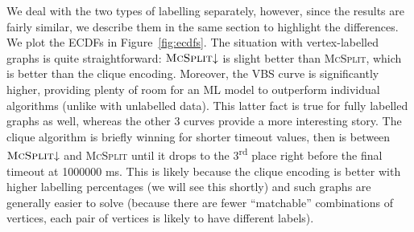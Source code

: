 \documentclass{l4proj}
\theoremstyle{definition}
\theoremstyle{remark}
\begin{document}
We deal with the two types of labelling separately, however, since the results
are fairly similar, we describe them in the same section to highlight the
differences. We plot the ECDFs in Figure~\ref{fig:ecdfs}. The situation with
vertex-labelled graphs is quite straightforward: $\textsc{McSplit}{\downarrow}$ is
slight better than \textsc{McSplit}, which is better than the clique encoding.
Moreover, the VBS curve is significantly higher, providing plenty of room for an
ML model to outperform individual algorithms (unlike with unlabelled data). This
latter fact is true for fully labelled graphs as well, whereas
the other 3 curves provide a more interesting story. The clique algorithm is
briefly winning for shorter timeout values, then is between
$\textsc{McSplit}{\downarrow}$ and \textsc{McSplit} until it drops to the
3\textsuperscript{rd} place right before the final timeout at \num{1000000} ms.
This is likely because the clique encoding is better with higher labelling
percentages (we will see this shortly) and such graphs are generally easier to
solve (because there are fewer ``matchable'' combinations of vertices, each pair
of vertices is likely to have different labels).
\end{document}
